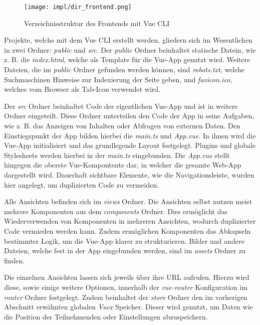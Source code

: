 \begin{figure}[htpb]
    \centering
    \texttt{[image: impl/dir\_frontend.png]}
    \caption{Verzeichnisstruktur des Frontends mit Vue CLI}
    \label{fig:impl-frontend-vuecli-dir}
\end{figure}

Projekte, welche mit dem Vue CLI erstellt werden, gliedern sich im Wesentlichen
in zwei Ordner: \textit{public} und \textit{src}. Der \textit{public} Ordner
beinhaltet statische Datein, wie z. B. die \textit{index.html}, welche als
Template für die Vue-App genutzt wird. Weitere Dateien, die im \textit{public}
Ordner gefunden werden können, sind \textit{robots.txt}, welche
Suchmaschinen Hinweise zur Indexierung der Seite geben, und
\textit{favicon.ico}, welches vom Browser als Tab-Icon verwendet wird.

Der \textit{src} Ordner beinhaltet Code der eigentlichen Vue-App und ist in
weitere Ordner eingeteilt. Diese Ordner unterteilen den Code der App in seine
Aufgaben, wie z. B. das Anzeigen von Inhalten oder Abfragen von externen Daten.
Den Einstiegspunkt der App bilden hierbei die \textit{main.ts} und
\textit{App.vue}. In ihnen wird die Vue-App initialisiert und das grundlegende
Layout festgelegt. Plugins und globale Stylesheets werden hierbei in der
\textit{main.ts} eingebunden. Die \textit{App.vue} stellt hingegen die oberste
Vue-Kompontente dar, in welcher die gesamte Web-App dargestellt wird. Dauerhaft
sichtbare Elemente, wie die Navigationsleiste, wurden hier angelegt, um
duplizierten Code zu vermeiden.

Alle Ansichten befinden sich im \textit{views} Ordner. Die Ansichten selbst
nutzen meist mehrere Komponenten aus dem \textit{components} Ordner. Dies
ermöglicht das Wiederverwenden von Komponenten in mehreren Ansichten, wodurch
duplizierter Code vermieden werden kann. Zudem ermöglichen Komponenten das
Abkapseln bestimmter Logik, um die Vue-App klarer zu strukturieren. Bilder und
andere Dateien, welche fest in der App eingebunden werden, sind im
\textit{assets} Ordner zu finden.

Die einzelnen Ansichten lassen sich jeweils über ihre URL aufrufen. Hierzu wird
diese, sowie einige weitere Optionen, innerhalb der \textit{vue-router}
Konfiguration im \textit{router} Ordner festgelegt. Zudem beinhaltet der
\textit{store} Ordner den im vorherigen Abschnitt erwähnten globalen
\textit{Vuex} Speicher. Dieser wird genutzt, um Daten wie die Position der
Teilnehmenden oder Einstellungen abzuspeichern.

